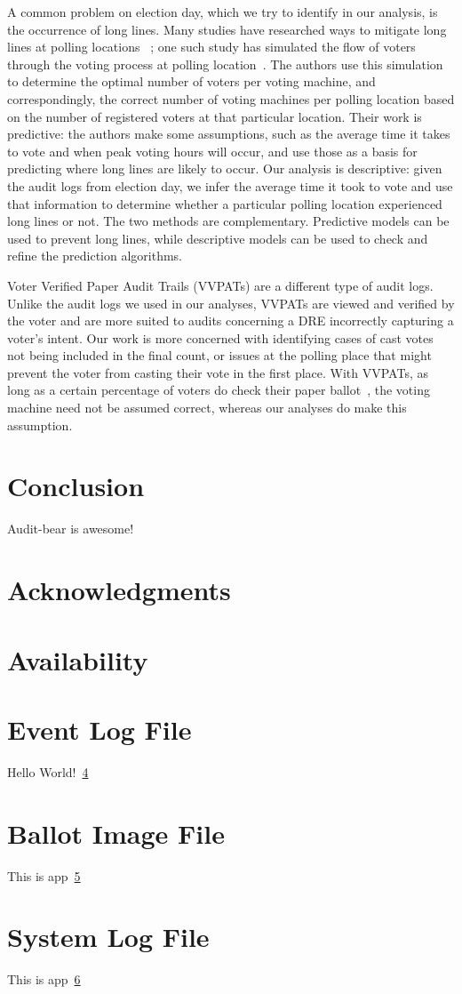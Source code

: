 \documentclass[letterpaper,twocolumn,10pt]{article}
\begin{document}
A common problem on election day, which we try to identify in our analysis, is the occurrence of long lines. Many studies have researched ways to mitigate long lines at polling locations ~\cite{Allen2006,Dow2007,Spencer2010,Wilson2008}; one such study has simulated the flow of voters through the voting process at polling location~\cite{Edel2010}. The authors use this simulation to determine the optimal number of voters per voting machine, and correspondingly, the correct number of voting machines per polling location based on the number of registered voters at that particular location. Their work is predictive: the authors make some assumptions, such as the average time it takes to vote and when peak voting hours will occur, and use those as a basis for predicting where long lines are likely to occur. Our analysis is descriptive: given the audit logs from election day, we infer the average time it took to vote and use that information to determine whether a particular polling location experienced long lines or not. The two methods are complementary. Predictive models can be used to prevent long lines, while descriptive models can be used to check and refine the prediction algorithms.

Voter Verified Paper Audit Trails (VVPATs) are a different type of audit logs. Unlike the audit logs we used in our analyses, VVPATs are viewed and verified by the voter and are more suited to audits concerning a DRE incorrectly capturing a voter\textquoteright s intent. Our work is more concerned with identifying cases of cast votes not being included in the final count, or issues at the polling place that might prevent the voter from casting their vote in the first place. With VVPATs, as long as a certain percentage of voters do check their paper ballot~\cite{Hall2006}, the voting machine need not be assumed correct, whereas our analyses do make this assumption.
\section{Conclusion}
Audit-bear is awesome!

\section{Acknowledgments}
\section{Availability}



{\footnotesize
}

\newpage
\begin{center}
\appendix
\section{Event Log File}\label{el} 
Hello World!~\ref{el}

\section{Ballot Image File}\label{bi}
This is app~\ref{bi}

\section{System Log File}\label{sl}
This is app~\ref{sl}
\end{center}
\end{document}
